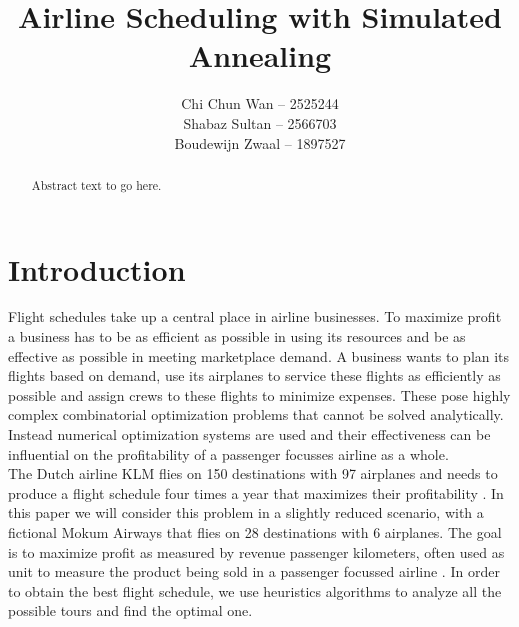 \documentclass[journal]{IEEEtran}
\author{Chi Chun Wan -- 2525244\\
Shabaz Sultan -- 2566703\\
Boudewijn Zwaal -- 1897527}
\title{Airline Scheduling with Simulated Annealing}
\begin{document}
\maketitle



\begin{abstract}
Abstract text to go here.
\end{abstract}


\section{Introduction}
Flight schedules take up a central place in airline businesses. To maximize profit a business has to be as efficient as possible in using its resources and be as effective as possible in meeting marketplace demand. A business wants to plan its flights based on demand, use its airplanes to service these flights as efficiently as possible and assign crews to these flights to minimize expenses. These pose highly complex combinatorial optimization problems that cannot be solved analytically. Instead numerical optimization systems are used and their effectiveness can be influential on the profitability of a passenger focusses airline as a whole.\\
The Dutch airline KLM flies on 150 destinations with 97 airplanes and needs to produce a flight schedule four times a year that maximizes their profitability \cite{Bian2003}. In this paper we will consider this problem in a slightly reduced scenario, with a fictional Mokum Airways that flies on 28 destinations with 6 airplanes. The goal is to maximize profit as measured by revenue passenger kilometers, often used as unit to measure the product being sold in a passenger focussed airline \cite{Schefczyk1993}. In order to obtain the best flight schedule, we use heuristics algorithms to analyze all the possible tours and find the optimal one.\\
\end{document}
